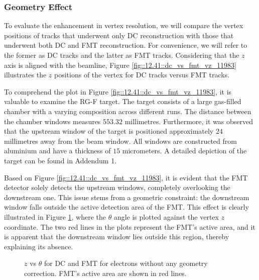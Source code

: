 \subsubsection{Geometry Effect}
\label{12.42::geometry_effect}
    To evaluate the enhancement in vertex resolution, we will compare the vertex positions of tracks that underwent only DC reconstruction with those that underwent both DC and FMT reconstruction.
    For convenience, we will refer to the former as DC tracks and the latter as FMT tracks.
    Considering that the $z$ axis is aligned with the beamline, Figure \ref{fig::12.41::dc_vs_fmt_vz_11983} illustrates the $z$ positions of the vertex for DC tracks versus FMT tracks.

    To comprehend the plot in Figure \ref{fig::12.41::dc_vs_fmt_vz_11983}, it is valuable to examine the RG-F target.
    The target consists of a large gas-filled chamber with a varying composition across different runs.
    The distance between the chamber windows measures $553.32$ millimetres.
    Furthermore, it was observed that the upstream window of the target is positioned approximately $24$ millimetres away from the beam window.
    All windows are constructed from aluminium and have a thickness of $15$ micrometers.
    A detailed depiction of the target can be found in Addendum 1.

    Based on Figure \ref{fig::12.41::dc_vs_fmt_vz_11983}, it is evident that the FMT detector solely detects the upstream windows, completely overlooking the downstream one.
    This issue stems from a geometric constraint: the downstream window falls outside the active detection area of the FMT.
    This effect is clearly illustrated in Figure \ref{eq::12.42::vz_vs_theta}, where the $\theta$ angle is plotted against the vertex $z$ coordinate.
    The two red lines in the plots represent the FMT's active area, and it is apparent that the downstream window lies outside this region, thereby explaining its absence.

    \begin{figure}[t!]
        \caption[$z$ vs $\theta$ for DC and FMT.]
        {$z$ vs $\theta$ for DC and FMT for electrons without any geometry correction.
        FMT's active area are shown in red lines.}
        \label{eq::12.42::vz_vs_theta}
    \end{figure}

